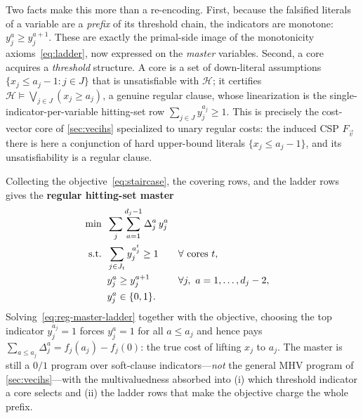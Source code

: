 Two facts make this more than a re-encoding. First, because the falsified
literals of a variable are a \emph{prefix} of its threshold chain, the
indicators are monotone: $y_j^{a} \ge y_j^{a+1}$. These are exactly the
primal-side image of the monotonicity axioms~\eqref{eq:ladder}, now expressed on
the \emph{master} variables. Second, a core acquires a \emph{threshold}
structure. A core is a set of down-literal assumptions
$\{x_j \le a_j-1 : j \in J\}$ that is unsatisfiable with $\mathcal{H}$; it
certifies $\mathcal{H} \models \bigvee_{j \in J}(x_j \ge a_j)$, a genuine
regular clause, whose linearization is the single-indicator-per-variable
hitting-set row $\sum_{j\in J} y_j^{a_j} \ge 1$. This is precisely the cost-vector
core of \cref{sec:vecihs} specialized to unary regular costs: the induced CSP
$F_{\vec v}$ there is here a conjunction of hard upper-bound literals
$\{x_j \le a_j-1\}$, and its unsatisfiability is a regular clause.

Collecting the objective~\eqref{eq:staircase}, the covering rows, and the ladder
rows gives the \textbf{regular hitting-set master}
\begin{align}
\min \;\; & \sum_{j} \sum_{a=1}^{d_j-1} \Delta_j^{a}\, y_j^{a}
   \label{eq:reg-master-obj}\\
\text{s.t.}\;\; & \sum_{j \in J_t} y_j^{a_j^{t}} \ge 1
   && \forall\text{ cores } t, \label{eq:reg-master-cover}\\
& y_j^{a} \ge y_j^{a+1}
   && \forall j,\ a = 1,\dots,d_j-2, \label{eq:reg-master-ladder}\\
& y_j^{a} \in \{0,1\}. \notag
\end{align}
Solving~\eqref{eq:reg-master-ladder} together with the objective, choosing the
top indicator $y_j^{a_j}=1$ forces $y_j^{a}=1$ for all $a \le a_j$ and hence
pays $\sum_{a\le a_j}\Delta_j^{a} = f_j(a_j)-f_j(0)$: the true cost of lifting
$x_j$ to $a_j$. The master is still a $0/1$ program over soft-clause
indicators---\emph{not} the general MHV program of \cref{sec:vecihs}---with the
multivaluedness absorbed into (i) which threshold indicator a core selects and
(ii) the ladder rows that make the objective charge the whole prefix.

